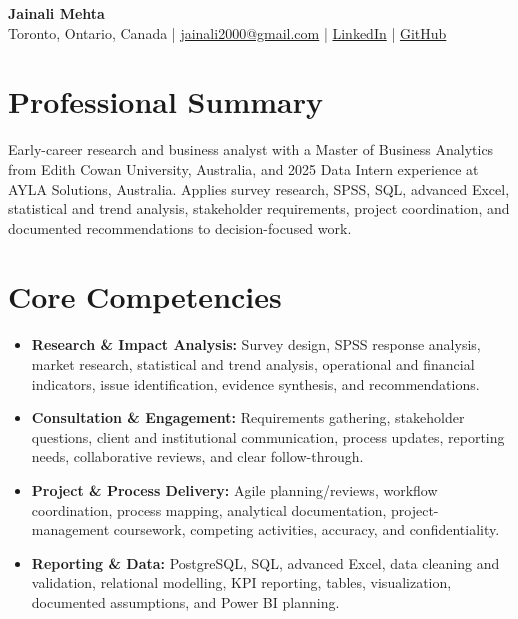 \documentclass[letterpaper,10pt]{article}
\begin{document}
\begin{center}
  {\fontsize{17}{19}\selectfont\textbf{Jainali Mehta}}\\[2pt]
  \small Toronto, Ontario, Canada \;|\;
  \href{mailto:jainali2000@gmail.com}{jainali2000@gmail.com} \;|\;
  \href{https://www.linkedin.com/in/jainali-mehta}{LinkedIn} \;|\;
  \href{https://github.com/jainalimehta}{GitHub}
\end{center}
\vspace{-7pt}

\section{Professional Summary}
\small Early-career research and business analyst with a Master of Business Analytics from Edith Cowan University, Australia, and 2025 Data Intern experience at AYLA Solutions, Australia. Applies survey research, SPSS, SQL, advanced Excel, statistical and trend analysis, stakeholder requirements, project coordination, and documented recommendations to decision-focused work.

\section{Core Competencies}
\begin{itemize}[leftmargin=0.16in,label=\textbullet,topsep=0pt,itemsep=1pt,parsep=0pt]
  \item \small \textbf{Research \& Impact Analysis:} Survey design, SPSS response analysis, market research, statistical and trend analysis, operational and financial indicators, issue identification, evidence synthesis, and recommendations.
  \item \small \textbf{Consultation \& Engagement:} Requirements gathering, stakeholder questions, client and institutional communication, process updates, reporting needs, collaborative reviews, and clear follow-through.
  \item \small \textbf{Project \& Process Delivery:} Agile planning/reviews, workflow coordination, process mapping, analytical documentation, project-management coursework, competing activities, accuracy, and confidentiality.
  \item \small \textbf{Reporting \& Data:} PostgreSQL, SQL, advanced Excel, data cleaning and validation, relational modelling, KPI reporting, tables, visualization, documented assumptions, and Power BI planning.
\end{itemize}
\end{document}
